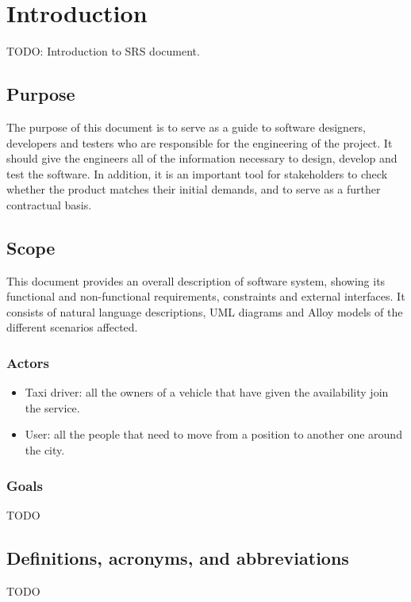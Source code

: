 \section{Introduction}      %
TODO: Introduction to \myTaxiService{} SRS document.
\subsection{Purpose}
The purpose of this document is to serve as a guide to software designers, developers and testers who are responsible for the engineering of the \myTaxiService{} project.
It should give the engineers all of the information necessary to design, develop and test the software.
In addition, it is an important tool for \myTaxiService{} stakeholders to check whether the product matches their initial demands, and to serve as a further contractual basis.
\subsection{Scope}
This document provides an overall description of \myTaxiService{} software system, showing its functional and non-functional requirements, constraints and external interfaces.
It consists of natural language descriptions, UML diagrams and Alloy models of the different scenarios affected.
\subsubsection{Actors}
\begin{itemize}
	\item Taxi driver: all the owners of a vehicle that have given the availability join the service.
	\item User: all the people that need to move from a position to another one around the city.
\end{itemize}
\subsubsection{Goals}
TODO
\subsection{Definitions, acronyms, and abbreviations}
TODO

